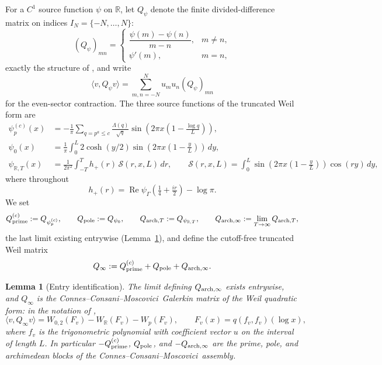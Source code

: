 \documentclass[11pt]{article}
\theoremstyle{plain}
\newtheorem{lemma}[theorem]{Lemma}
\theoremstyle{definition}
\theoremstyle{remark}
\newcommand{\R}{\mathbb R}
\newcommand{\ccm}{Connes--Consani--Moscovici}
\newcommand{\dd}{\,d}
\newcommand{\Qinf}{Q_{\infty}}
\newcommand{\Wp}{W_p}
\newcommand{\WR}{W_{\R}}
\newcommand{\Wzt}{W_{0,2}}
\begin{document}
For a $C^1$ source function $\psi$ on $\R$, let $Q_\psi$ denote the finite
divided-difference matrix on indices $I_N=\{-N,\ldots,N\}$:
\[
 (Q_\psi)_{mn}=
 \begin{cases}
   \dfrac{\psi(m)-\psi(n)}{m-n},& m\ne n,\\[1.2ex]
   \psi'(m),& m=n,
 \end{cases}
\]
exactly the structure of \cite[Prop.~4.1]{ConnesvanSuijlekom2025}, and write
\[
        \langle v,Q_\psi v\rangle
        =\sum_{m,n=-N}^{N}u_m u_n (Q_\psi)_{mn}
\]
for the even-sector contraction.  The three source functions of the truncated
Weil form are
\begin{align}
\psi_p^{(c)}(x)&=
-\frac1\pi\sum_{q=p^a\le c}\frac{\Lambda(q)}{\sqrt q}
 \sin\!\left(2\pi x\left(1-\frac{\log q}{L}\right)\right),
 \label{eq:prime-source}\\
\psi_0(x)&=
\frac1\pi\int_0^L
2\cosh(y/2)\sin\!\left(2\pi x\left(1-\frac yL\right)\right)\dd y,
 \label{eq:pole-source}\\
\psi_{\R,T}(x)&=\frac{1}{2\pi^2}\int_{-T}^{T}
h_+(r)\,\mathcal S(r,x,L)\dd r,
\qquad
\mathcal S(r,x,L)=
\int_0^L\sin\!\left(2\pi x\left(1-\frac yL\right)\right)\cos(ry)\dd y,
 \label{eq:arch-source}
\end{align}
where throughout
\[
        h_+(r)=\operatorname{Re}\psi_\Gamma\!\left(\tfrac14+\tfrac{ir}2\right)-\log\pi .
\]
We set
\[
Q_{\rm prime}^{(c)}:=Q_{\psi_p^{(c)}},\qquad
Q_{\rm pole}:=Q_{\psi_0},\qquad
Q_{{\rm arch},T}:=Q_{\psi_{\R,T}},\qquad
Q_{{\rm arch},\infty}:=\lim_{T\to\infty}Q_{{\rm arch},T},
\]
the last limit existing entrywise (Lemma~\ref{lem:entry-id}), and define the
cutoff-free truncated Weil matrix
\begin{equation}\label{eq:Qinf-def}
        \Qinf:=Q_{\rm prime}^{(c)}+Q_{\rm pole}+Q_{{\rm arch},\infty}.
\end{equation}

\begin{lemma}[Entry identification]\label{lem:entry-id}
The limit defining $Q_{{\rm arch},\infty}$ exists entrywise, and $\Qinf$ is
the \ccm\ Galerkin matrix of the Weil quadratic form: in the notation of
\cite[Eqs.~(3.10)--(3.11), (3.16)]{ConnesConsaniMoscovici2025},
\[
        \langle v,\Qinf v\rangle
        =\Wzt(F_v)-\WR(F_v)-\Wp(F_v),
        \qquad F_v(x)=q(f_v,f_v)(\log x),
\]
where $f_v$ is the trigonometric polynomial with coefficient vector $u$ on the
interval of length $L$.  In particular $-Q_{\rm prime}^{(c)}$, $Q_{\rm pole}$,
and $-Q_{{\rm arch},\infty}$ are the prime, pole, and archimedean blocks of
the \ccm\ assembly.
\end{lemma}
\end{document}
